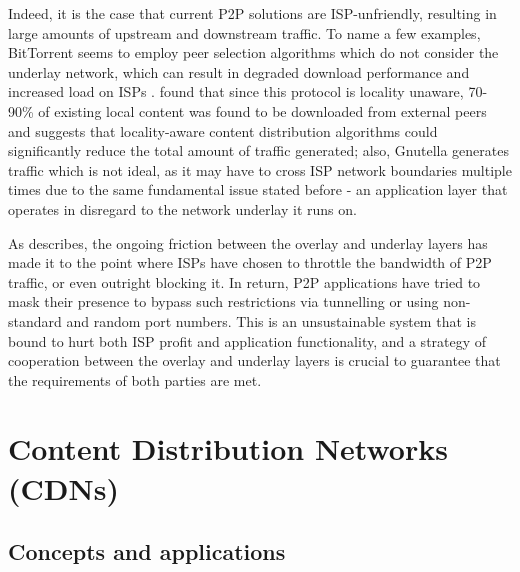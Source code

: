     Indeed, it is the case that current P2P solutions are ISP-unfriendly, resulting in large amounts of upstream and downstream traffic.
    To name a few examples, BitTorrent seems to employ peer selection algorithms which do not consider the underlay network, which can result in degraded download performance and increased load on ISPs \cite{qin2009}.
    \cite{karagiannis} found that since this protocol is locality unaware, 70-90\% of existing local content was found to be downloaded from external peers and suggests that locality-aware content distribution algorithms could significantly reduce the total amount of traffic generated; also, Gnutella generates traffic which is not ideal, as it may have to cross ISP network boundaries multiple times \cite{estimating-gnutella} due to the same fundamental issue stated before - an application layer that operates in disregard to the network underlay it runs on.

    As \cite{dan-Commag10} describes, the ongoing friction between the overlay and underlay layers has made it to the point where ISPs have chosen to throttle the bandwidth of P2P traffic, or even outright blocking it.
    In return, P2P applications have tried to mask their presence to bypass such restrictions via tunnelling or using non-standard and random port numbers.
    This is an unsustainable system that is bound to hurt both ISP profit and application functionality, and a strategy of cooperation between the overlay and underlay layers is crucial to guarantee that the requirements of both parties are met.


\section{Content Distribution Networks (CDNs)}

\subsection{Concepts and applications}

